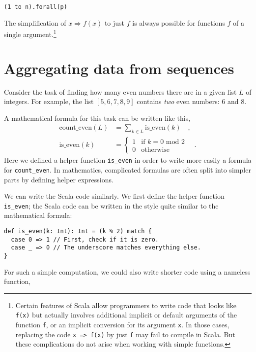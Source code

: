 \begin{lstlisting}
(1 to n).forall(p)
\end{lstlisting}

The simplification of $x\Rightarrow f(x)$ to just $f$ is always
possible for functions $f$ of a single argument.\footnote{Certain features of Scala allow programmers to write code that looks
like \lstinline!f(x)! but actually involves additional implicit or
default arguments of the function \lstinline!f!, or an implicit conversion
for its argument \lstinline!x!. In those cases, replacing the code
\lstinline!x => f(x)! by just \lstinline!f! may fail to compile
in Scala. But these complications do not arise when working with simple
functions.}

\section{Aggregating data from sequences}

Consider the task of finding how many even numbers there are in a
given list $L$ of integers. For example, the list $\left[5,6,7,8,9\right]$
contains \emph{two} even numbers: $6$ and $8$.

A mathematical formula for this task can be written like this,
\begin{align*}
\text{count\_even}\left(L\right) & =\sum_{k\in L}\text{is\_even}\left(k\right)\quad,\\
\text{is\_even}\left(k\right) & =\begin{cases}
1 & \text{if }k=0\text{ mod }2\\
0 & \text{otherwise}
\end{cases}\quad.
\end{align*}
Here we defined a helper function \texttt{}\lstinline!is_even! in
order to write more easily a formula for \lstinline!count_even!.
In mathematics, complicated formulas are often split into simpler
parts by defining helper expressions. 

We can write the Scala code similarly. We first define the helper
function \lstinline!is_even!; the Scala code can be written in the
style quite similar to the mathematical formula:

\begin{lstlisting}
def is_even(k: Int): Int = (k % 2) match {
  case 0 => 1 // First, check if it is zero.
  case _ => 0 // The underscore matches everything else.
}
\end{lstlisting}

For such a simple computation, we could also write shorter code using
a nameless function,

